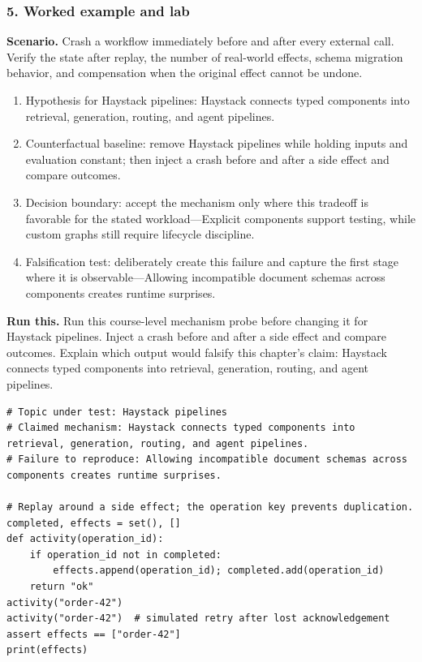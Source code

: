 \subsubsection*{5. Worked example and lab}
\textbf{Scenario.} Crash a workflow immediately before and after every external call. Verify the state after replay, the number of real-world effects, schema migration behavior, and compensation when the original effect cannot be undone.
\begin{enumerate}
\item Hypothesis for Haystack pipelines: Haystack connects typed components into retrieval, generation, routing, and agent pipelines.
\item Counterfactual baseline: remove Haystack pipelines while holding inputs and evaluation constant; then inject a crash before and after a side effect and compare outcomes.
\item Decision boundary: accept the mechanism only where this tradeoff is favorable for the stated workload—Explicit components support testing, while custom graphs still require lifecycle discipline.
\item Falsification test: deliberately create this failure and capture the first stage where it is observable—Allowing incompatible document schemas across components creates runtime surprises.
\end{enumerate}
\textbf{Run this.} Run this course-level mechanism probe before changing it for Haystack pipelines. Inject a crash before and after a side effect and compare outcomes. Explain which output would falsify this chapter's claim: Haystack connects typed components into retrieval, generation, routing, and agent pipelines.
\begin{Verbatim}[fontsize=\scriptsize]
# Topic under test: Haystack pipelines
# Claimed mechanism: Haystack connects typed components into retrieval, generation, routing, and agent pipelines.
# Failure to reproduce: Allowing incompatible document schemas across components creates runtime surprises.

# Replay around a side effect; the operation key prevents duplication.
completed, effects = set(), []
def activity(operation_id):
    if operation_id not in completed:
        effects.append(operation_id); completed.add(operation_id)
    return "ok"
activity("order-42")
activity("order-42")  # simulated retry after lost acknowledgement
assert effects == ["order-42"]
print(effects)
\end{Verbatim}
